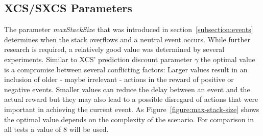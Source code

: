 \subsection{XCS/SXCS Parameters}
\label{subsection:xcs-parameters}

The parameter \emph{maxStackSize} that was introduced in section~\ref{subsection:events} determines when the stack overflows and a neutral event occurs. While further research is required, a relatively good value was determined by several experiments. Similar to XCS' prediction discount parameter $\gamma$ the optimal value is a compromise between several conflicting factors: Larger values result in an inclusion of older - maybe irrelevant - actions in the reward of positive or negative events. Smaller values can reduce the delay between an event and the actual reward but they may also lead to a possible disregard of actions that were important in achieving the current event. As Figure~\ref{figure:max-stack-size} shows the optimal value depends on the complexity of the scenario. For comparison in all tests a value of $8$ will be used.



